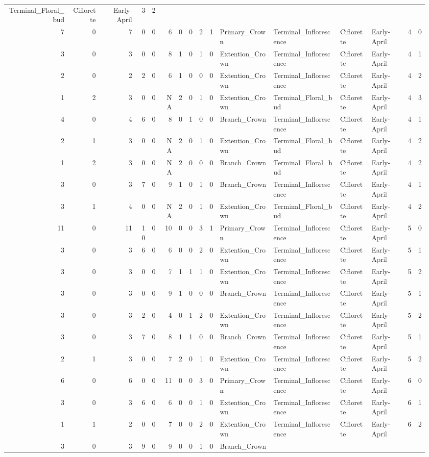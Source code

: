 \documentclass[]{article}
\begin{document}
\begin{longtable}[]{@{}rrrrrrrrrrllllrl@{}}
Terminal\_Floral\_bud & Ciflorette & Early-April & 3 & 2\tabularnewline
7 & 0 & 7 & 0 & 0 & 6 & 0 & 0 & 2 & 1 & Primary\_Crown &
Terminal\_Inflorescence & Ciflorette & Early-April & 4 &
0\tabularnewline
3 & 0 & 3 & 0 & 0 & 8 & 1 & 0 & 1 & 0 & Extention\_Crown &
Terminal\_Inflorescence & Ciflorette & Early-April & 4 &
1\tabularnewline
2 & 0 & 2 & 2 & 0 & 6 & 1 & 0 & 0 & 0 & Extention\_Crown &
Terminal\_Inflorescence & Ciflorette & Early-April & 4 &
2\tabularnewline
1 & 2 & 3 & 0 & 0 & NA & 2 & 0 & 1 & 0 & Extention\_Crown &
Terminal\_Floral\_bud & Ciflorette & Early-April & 4 & 3\tabularnewline
4 & 0 & 4 & 6 & 0 & 8 & 0 & 1 & 0 & 0 & Branch\_Crown &
Terminal\_Inflorescence & Ciflorette & Early-April & 4 &
1\tabularnewline
2 & 1 & 3 & 0 & 0 & NA & 2 & 0 & 1 & 0 & Extention\_Crown &
Terminal\_Floral\_bud & Ciflorette & Early-April & 4 & 2\tabularnewline
1 & 2 & 3 & 0 & 0 & NA & 2 & 0 & 0 & 0 & Branch\_Crown &
Terminal\_Floral\_bud & Ciflorette & Early-April & 4 & 2\tabularnewline
3 & 0 & 3 & 7 & 0 & 9 & 1 & 0 & 1 & 0 & Branch\_Crown &
Terminal\_Inflorescence & Ciflorette & Early-April & 4 &
1\tabularnewline
3 & 1 & 4 & 0 & 0 & NA & 2 & 0 & 1 & 0 & Extention\_Crown &
Terminal\_Floral\_bud & Ciflorette & Early-April & 4 & 2\tabularnewline
11 & 0 & 11 & 10 & 0 & 10 & 0 & 0 & 3 & 1 & Primary\_Crown &
Terminal\_Inflorescence & Ciflorette & Early-April & 5 &
0\tabularnewline
3 & 0 & 3 & 6 & 0 & 6 & 0 & 0 & 2 & 0 & Extention\_Crown &
Terminal\_Inflorescence & Ciflorette & Early-April & 5 &
1\tabularnewline
3 & 0 & 3 & 0 & 0 & 7 & 1 & 1 & 1 & 0 & Extention\_Crown &
Terminal\_Inflorescence & Ciflorette & Early-April & 5 &
2\tabularnewline
3 & 0 & 3 & 0 & 0 & 9 & 1 & 0 & 0 & 0 & Branch\_Crown &
Terminal\_Inflorescence & Ciflorette & Early-April & 5 &
1\tabularnewline
3 & 0 & 3 & 2 & 0 & 4 & 0 & 1 & 2 & 0 & Extention\_Crown &
Terminal\_Inflorescence & Ciflorette & Early-April & 5 &
2\tabularnewline
3 & 0 & 3 & 7 & 0 & 8 & 1 & 1 & 0 & 0 & Branch\_Crown &
Terminal\_Inflorescence & Ciflorette & Early-April & 5 &
1\tabularnewline
2 & 1 & 3 & 0 & 0 & 7 & 2 & 0 & 1 & 0 & Extention\_Crown &
Terminal\_Inflorescence & Ciflorette & Early-April & 5 &
2\tabularnewline
6 & 0 & 6 & 0 & 0 & 11 & 0 & 0 & 3 & 0 & Primary\_Crown &
Terminal\_Inflorescence & Ciflorette & Early-April & 6 &
0\tabularnewline
3 & 0 & 3 & 6 & 0 & 6 & 0 & 0 & 1 & 0 & Extention\_Crown &
Terminal\_Inflorescence & Ciflorette & Early-April & 6 &
1\tabularnewline
1 & 1 & 2 & 0 & 0 & 7 & 0 & 0 & 2 & 0 & Extention\_Crown &
Terminal\_Inflorescence & Ciflorette & Early-April & 6 &
2\tabularnewline
3 & 0 & 3 & 9 & 0 & 9 & 0 & 0 & 1 & 0 & Branch\_Crown &

\end{longtable}
\end{document}
